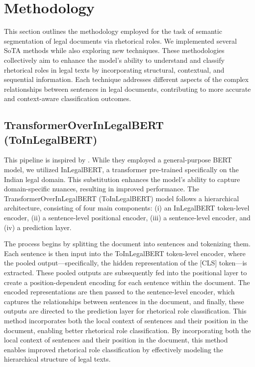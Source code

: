 \section{Methodology}
This section outlines the methodology employed for the task of semantic segmentation of legal documents via rhetorical roles. We implemented several SoTA methods while also exploring new techniques. These methodologies collectively aim to enhance the model's ability to understand and classify rhetorical roles in legal texts by incorporating structural, contextual, and sequential information. Each technique addresses different aspects of the complex relationships between sentences in legal documents, contributing to more accurate and context-aware classification outcomes.

\subsection{TransformerOverInLegalBERT (ToInLegalBERT)}
This pipeline is inspired by \citet{marino2023automatic}. While they employed a general-purpose BERT model, we utilized InLegalBERT, a transformer pre-trained specifically on the Indian legal domain. This substitution enhances the model’s ability to capture domain-specific nuances, resulting in improved performance. The TransformerOverInLegalBERT (ToInLegalBERT) model follows a hierarchical architecture, consisting of four main components: (i) an InLegalBERT token-level encoder, (ii) a sentence-level positional encoder, (iii) a sentence-level encoder, and (iv) a prediction layer.

The process begins by splitting the document into sentences and tokenizing them.  Each sentence is then input into the ToInLegalBERT token-level encoder, where the pooled output—specifically, the hidden representation of the [CLS] token—is extracted. These pooled outputs are subsequently fed into the positional layer to create a position-dependent encoding for each sentence within the document. The encoded representations are then passed to the sentence-level encoder, which captures the relationships between sentences in the document, and finally, these outputs are directed to the prediction layer for rhetorical role classification. This method incorporates both the local context of sentences and their position in the document, enabling better rhetorical role classification. By incorporating both the local context of sentences and their position in the document, this method enables improved rhetorical role classification by effectively modeling the hierarchical structure of legal texts.

